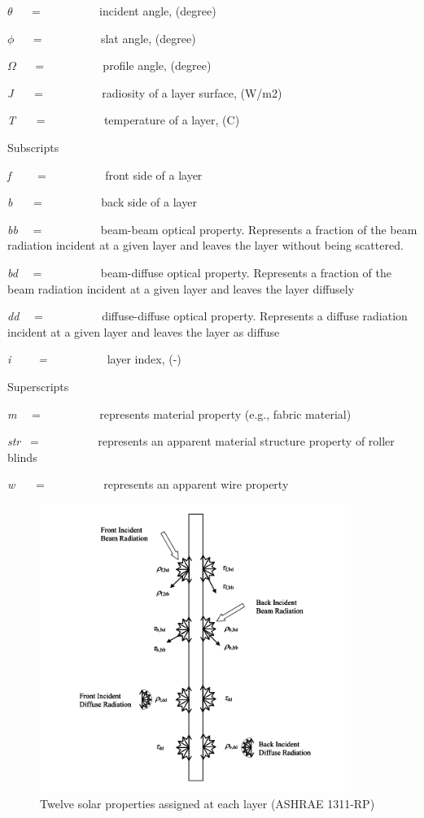 $\theta$ ~~ = ~~~~~~~~~ incident angle, (degree)

$\phi$ ~~ = ~~~~~~~~~ slat angle, (degree)

$\Omega$ ~~ = ~~~~~~~~~ profile angle, (degree)

\emph{J}~~~ = ~~~~~~~~~ radiosity of a layer surface, (W/m2)

\emph{T}~~~ = ~~~~~~~~~ temperature of a layer, (C)

Subscripts

\emph{f}~~~~ = ~~~~~~~~~ front side of a layer

\emph{b}~~~ = ~~~~~~~~~ back side of a layer

\emph{bb}~~ = ~~~~~~~~~ beam-beam optical property. Represents a fraction of the beam radiation incident at a given layer and leaves the layer without being scattered.

\emph{bd}~~ = ~~~~~~~~~ beam-diffuse optical property. Represents a fraction of the beam radiation incident at a given layer and leaves the layer diffusely

\emph{dd}~~ = ~~~~~~~~~ diffuse-diffuse optical property. Represents a diffuse radiation incident at a given layer and leaves the layer as diffuse

\emph{i~~~~ = ~~~~~~~~~} layer index, (-)

Superscripts

\emph{m}~~ = ~~~~~~~~~ represents material property (e.g., fabric material)

\emph{str}~ = ~~~~~~~~~ represents an apparent material structure property of roller blinds

\emph{w}~~~ = ~~~~~~~~~ represents an apparent wire property

\begin{figure}[hbtp] %
\centering
\includegraphics[width=0.9\textwidth, height=0.9\textheight, keepaspectratio=true]{media/image1830.svg.png}
\caption{Twelve solar properties assigned at each layer (ASHRAE 1311-RP) \protect \label{fig:twelve-solar-properties-assigned-at-each}}
\end{figure}

